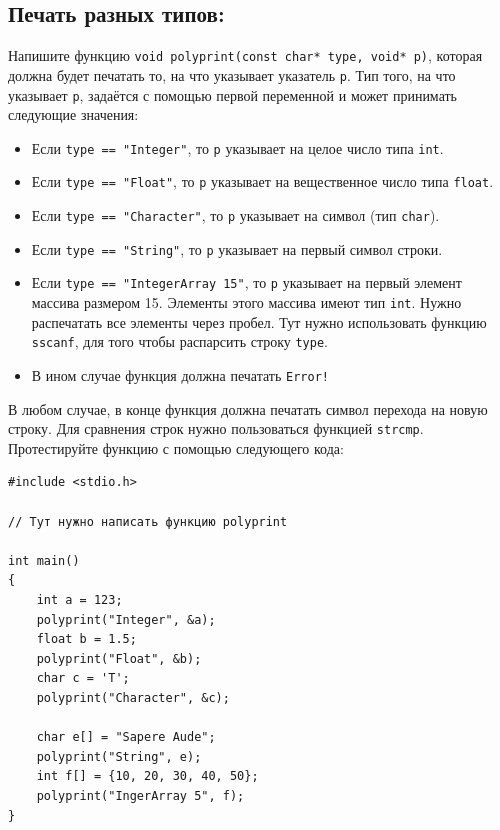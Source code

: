 \documentclass[10pt]{article}
\begin{document}
\newpage
\subsection{Печать разных типов:}
Напишите функцию \texttt{void polyprint(const char* type, void* p)}, которая должна будет печатать то, на что указывает указатель \texttt{p}. Тип того, на что указывает \texttt{p}, задаётся с помощью первой переменной и может принимать следующие значения:
\begin{itemize}
\item Если \texttt{type == "Integer"}, то \texttt{p} указывает на целое число типа \texttt{int}.
\item Если \texttt{type == "Float"}, то \texttt{p} указывает на вещественное число типа \texttt{float}.
\item Если \texttt{type == "Character"}, то \texttt{p} указывает на символ (тип \texttt{char}).
\item Если \texttt{type == "String"}, то \texttt{p} указывает на первый символ строки.
\item Если \texttt{type == "IntegerArray 15"}, то \texttt{p} указывает на первый элемент массива размером 15. Элементы этого массива имеют тип \texttt{int}. Нужно распечатать все элементы через пробел. Тут нужно использовать функцию \texttt{sscanf}, для того чтобы распарсить строку \texttt{type}.
\item В ином случае функция должна печатать \texttt{Error!}
\end{itemize}
В любом случае, в конце функция должна печатать символ перехода на новую строку. Для сравнения строк нужно пользоваться функцией \texttt{strcmp}. Протестируйте функцию с помощью следующего кода:

\begin{lstlisting}
#include <stdio.h>

// Тут нужно написать функцию polyprint

int main() 
{
    int a = 123;
    polyprint("Integer", &a);
    float b = 1.5;
    polyprint("Float", &b);
    char c = 'T';
    polyprint("Character", &c);
    
    char e[] = "Sapere Aude";
    polyprint("String", e);
    int f[] = {10, 20, 30, 40, 50};
    polyprint("IngerArray 5", f);
}
\end{lstlisting}
\end{document}
